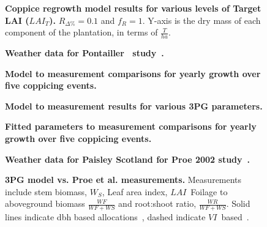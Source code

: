 \documentclass[10pt]{article}
\newcommand{\LAIt}{\ensuremath{LAI_{T}}}
\newcommand{\LAI}{\ensuremath{LAI}}
\newcommand{\Rdp}{\ensuremath{R_{\Delta\%}}}
\newcommand{\WS}{\ensuremath{W_S}}
\newcommand{\fR}{\ensuremath{f_R}}
\newcommand{\VI}{\ensuremath{VI}}
\begin{document}
\begin{figure}%
\ifdefined\SHOWFIGS
  \centering
  
\fi
  \caption{{\bf Coppice regrowth model results for various levels of
    Target LAI (\LAIt).}  $\Rdp = 0.1$ and $\fR=1$.  Y-axis is the dry
    mass of each component of the plantation, in terms of
    $\frac{T}{ha}$.}
  \label{fig:lai}
\end{figure}

\begin{figure}%
\ifdefined\SHOWFIGS
  \centering
  
\fi
  \caption{{ \bf Weather data for Pontailler~\cite{Pontailler1999} study~\cite{Geiger2002,TutiempoNetwork2013}. }}
  \label{fig:pontailler-weather}
\end{figure}

\begin{figure}%
\ifdefined\SHOWFIGS
  \centering
  
\fi
  \caption{{\bf Model to measurement comparisons for yearly growth over five
    coppicing events.} }
\label{fig:pont-biomass}
\end{figure}

\begin{figure}%
\ifdefined\SHOWFIGS
  \centering
  
\fi
  \caption{{ \bf Model to measurement results for various 3PG parameters. } }
\label{fig:pont-variation}
\end{figure}

\begin{figure}%
\ifdefined\SHOWFIGS
  \centering
  
\fi
  \caption{{ \bf Fitted parameters to measurement comparisons for yearly growth
      over five coppicing events. } }
\label{fig:pont-best}
\end{figure}

\begin{figure}%
\ifdefined\SHOWFIGS
  \centering
  
\fi
  \caption{ { \bf Weather data for Paisley Scotland for Proe 2002
    study~\cite{Proe2002,MetOffice2013}. } }
  \label{fig:proe-weather}
\end{figure}

\begin{figure}%
\ifdefined\SHOWFIGS
  \centering
  
\fi
  \caption{ {\bf 3PG  model vs. Proe et al. measurements.}   Measurements include stem biomass, \WS, Leaf area index, \LAI~Foilage to aboveground biomass $\frac{WF}{WF+WS}$ and root:shoot ratio, $\frac{WR}{WF+WS}$.  Solid lines indicate dbh based allocations~\cite{Headlee2012}, dashed indicate \VI~based~\cite{Pontailler1999}.}
  \label{fig:proe-wood}
\end{figure}
\end{document}
